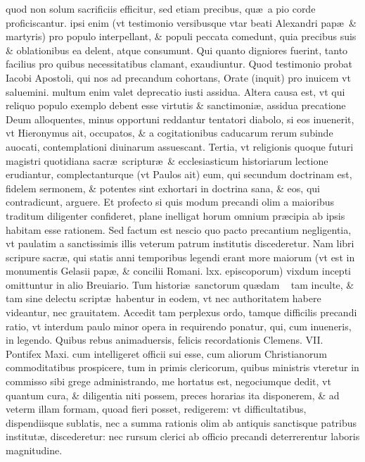 \documentclass[a5paper,10pt]{book}
\def\ae{æ}
\begin{document}
quod %
non solum sacrificiis efficitur, sed etiam precibus, qu\ae \ a pio corde proficiscantur.
ipsi %
enim (vt testimonio versibusque vtar beati Alexandri pap\ae \ \& martyris) pro populo interpellant, \& populi peccata comedunt, quia precibus suis \& oblationibus ea delent, atque consumunt.
Qui quanto digniores fuerint, tanto facilius pro quibus necessitatibus clamant, exaudiuntur.
Quod testimonio probat Iacobi Apostoli, qui nos ad precandum cohortans, Orate (inquit) pro inuicem vt saluemini.
multum %
enim valet deprecatio iusti assidua.
Altera causa est, vt qui reliquo populo exemplo debent esse virtutis \& sanctimoni\ae , assidua precatione Deum alloquentes, minus opportuni reddantur tentatori diabolo, si eos inuenerit, vt Hieronymus ait, occupatos, \& a cogitationibus caducarum rerum subinde auocati, contemplationi diuinarum assuescant.
Tertia, vt religionis quoque futuri magistri quotidiana sacr\ae \ scriptur\ae \ \& ecclesiasticum historiarum lectione erudiantur, complectanturque (vt Paulos ait) eum, qui secundum doctrinam est, fidelem 
sermonem, \& potentes sint exhortari in doctrina sana, \& eos, qui contradicunt, arguere.
Et profecto si quis modum precandi olim a maioribus traditum diligenter confideret, plane inelligat horum omnium pr\ae cipia ab ipsis habitam esse rationem.
Sed factum est nescio quo pacto precantium negligentia, vt paulatim a sanctissimis illis veterum patrum institutis discederetur.
Nam libri scripure sacr\ae, qui statis anni temporibus legendi erant more maiorum (vt est in monumentis Gelasii pap\ae, \& concilii Romani. lxx. episcoporum) vixdum incepti omittuntur in alio Breuiario.
Tum histori\ae \ sanctorum qu\ae dam \ %
tam inculte, \& tam sine delectu script\ae \ habentur in eodem, vt nec authoritatem habere videantur, nec grauitatem.
Accedit tam perplexus ordo, tamque difficilis precandi ratio, vt interdum paulo minor opera in requirendo ponatur, qui, cum inueneris, in legendo.
Quibus rebus animaduersis, felicis recordationis Clemens. VII. Pontifex Maxi. cum intelligeret officii sui esse, cum aliorum Christianorum commoditatibus prospicere, tum in primis clericorum, quibus ministris vteretur in commisso sibi grege administrando, me hortatus est, negociumque dedit, vt quantum cura, \& diligentia niti possem, preces horarias ita disponerem, \& ad veterm illam formam, quoad fieri posset, redigerem:
vt difficultatibus, dispendiisque sublatis, nec a summa rationis olim ab antiquis sanctisque patribus institut\ae, discederetur:
nec rursum clerici ab officio precandi deterrerentur laboris magnitudine.
\end{document}
